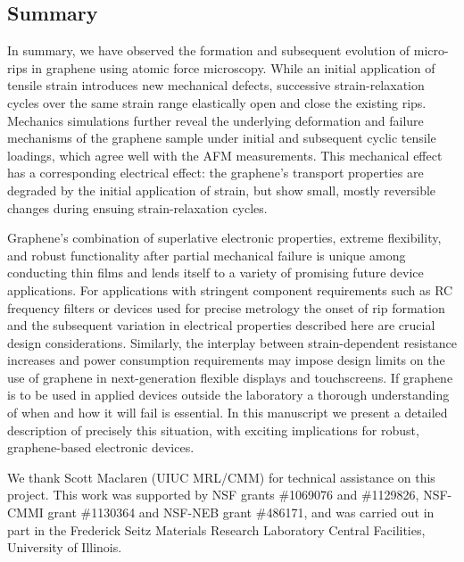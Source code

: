 \documentclass[edeposit,fullpage,draftthesis]{uiucthesis2009}
\begin{document}
    \subsection{Summary}

        In summary, we have observed the formation and subsequent evolution of
        micro-rips in graphene using atomic force microscopy. While an initial
        application of tensile strain introduces new mechanical defects, successive
        strain-relaxation cycles over the same strain range elastically open and close
        the existing rips. Mechanics simulations further reveal the underlying
        deformation and failure mechanisms of the graphene sample under initial and
        subsequent cyclic tensile loadings, which agree well with the AFM measurements.
        This mechanical effect has a corresponding electrical effect: the graphene's
        transport properties are degraded by the initial application of strain, but
        show small, mostly reversible changes during ensuing strain-relaxation cycles.
        
        Graphene's combination of superlative electronic properties, extreme
        flexibility, and robust functionality after partial mechanical failure is
        unique among conducting thin films and lends itself to a variety of promising
        future device applications. For applications with stringent component
        requirements such as RC frequency filters or devices used for precise metrology
        the onset of rip formation and the subsequent variation in electrical
        properties described here are crucial design considerations. Similarly, the
        interplay between strain-dependent resistance increases and power consumption
        requirements may impose design limits on the use of graphene in next-generation
        flexible displays and touchscreens. If graphene is to be used in applied
        devices outside the laboratory a thorough understanding of when and how it will
        fail is essential. In this manuscript we present a detailed description of
        precisely this situation, with exciting implications for robust, graphene-based
        electronic devices.

        We thank Scott Maclaren (UIUC MRL/CMM) for technical assistance on this project. This work was
        supported by NSF grants \#1069076 and \#1129826, NSF-CMMI grant
        \#1130364 and NSF-NEB grant \#486171, and was carried out
        in part in the Frederick Seitz Materials Research Laboratory Central
        Facilities, University of Illinois.
\end{document}
